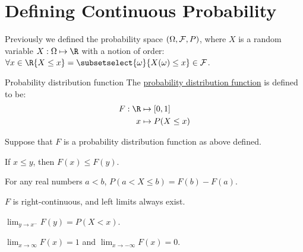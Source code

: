 \documentclass[../Main.tex]{subfiles}
\begin{document}
\section{Defining Continuous Probability}
Previously we defined the probability space $\left(\Omega, \mathcal{F}, P\right)$, where $X$ is a random variable $X : \Omega \mapsto \R$ with a notion of order: $\forall x \in \R \{X \leq x\} = \subsetselect{\omega}{X(\omega) \leq x} \in \sigalg$.
\begin{definition}{Probability distribution function}
    The \underline{probability distribution function} is defined to be:
    \begin{align*}
        F : \R &\mapsto [0, 1] \\
        x &\mapsto P(X \leq x)
    \end{align*}
\end{definition}
\begin{propositions}{
        Suppose that $F$ is a probability distribution function as above defined.
        \label{propsPDFProps}
    }
    \item If $x \leq y$, then $F(x) \leq F(y)$. \label{propPDFIncreasing}
    \item For any real numbers $a < b$, $P(a < X \leq b) = F(b) - F(a)$. \label{propPDFSubtract}
    \item $F$ is right-continuous, and left limits always exist. \label{propPDFContinuity}
    \item $\lim_{y \to x^-} F(y) = P(X < x)$.\label{propPDFStrictLessThan}
    \item $\lim_{x \to \infty} F(x) = 1$ and $\lim_{x \to -\infty} F(x) = 0$. \label{propPDFLimits}
\end{propositions}
\end{document}
